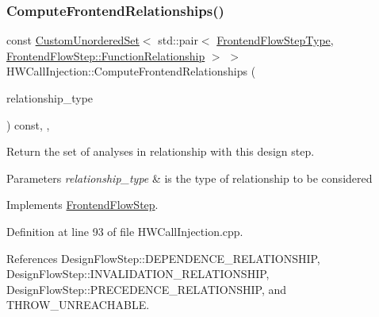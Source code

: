 \subsubsection{\texorpdfstring{Compute\+Frontend\+Relationships()}{ComputeFrontendRelationships()}}
{\footnotesize\ttfamily const \hyperlink{classCustomUnorderedSet}{Custom\+Unordered\+Set}$<$ std\+::pair$<$ \hyperlink{frontend__flow__step_8hpp_afeb3716c693d2b2e4ed3e6d04c3b63bb}{Frontend\+Flow\+Step\+Type}, \hyperlink{classFrontendFlowStep_af7cf30f2023e5b99e637dc2058289ab0}{Frontend\+Flow\+Step\+::\+Function\+Relationship} $>$ $>$ H\+W\+Call\+Injection\+::\+Compute\+Frontend\+Relationships (\begin{DoxyParamCaption}\item[{const \hyperlink{classDesignFlowStep_a723a3baf19ff2ceb77bc13e099d0b1b7}{Design\+Flow\+Step\+::\+Relationship\+Type}}]{relationship\+\_\+type }\end{DoxyParamCaption}) const\hspace{0.3cm}{\ttfamily [override]}, {\ttfamily [private]}, {\ttfamily [virtual]}}



Return the set of analyses in relationship with this design step. 


\begin{DoxyParams}{Parameters}
{\em relationship\+\_\+type} & is the type of relationship to be considered \\
\hline
\end{DoxyParams}


Implements \hyperlink{classFrontendFlowStep_abeaff70b59734e462d347ed343dd700d}{Frontend\+Flow\+Step}.



Definition at line 93 of file H\+W\+Call\+Injection.\+cpp.



References Design\+Flow\+Step\+::\+D\+E\+P\+E\+N\+D\+E\+N\+C\+E\+\_\+\+R\+E\+L\+A\+T\+I\+O\+N\+S\+H\+IP, Design\+Flow\+Step\+::\+I\+N\+V\+A\+L\+I\+D\+A\+T\+I\+O\+N\+\_\+\+R\+E\+L\+A\+T\+I\+O\+N\+S\+H\+IP, Design\+Flow\+Step\+::\+P\+R\+E\+C\+E\+D\+E\+N\+C\+E\+\_\+\+R\+E\+L\+A\+T\+I\+O\+N\+S\+H\+IP, and T\+H\+R\+O\+W\+\_\+\+U\+N\+R\+E\+A\+C\+H\+A\+B\+LE.

\mbox{\label{classHWCallInjection_a9d5dd1b5b7abe33cced04220a229303c}} 

